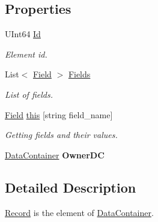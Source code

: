 \subsection*{Properties}
\begin{DoxyCompactItemize}
\item 
UInt64 \hyperlink{class_dwarf_d_b_1_1_data_structures_1_1_record_a6b33388f9fa7edcea1e29890da207be4}{Id}
\begin{DoxyCompactList}\small\item\em Element id. \item\end{DoxyCompactList}\item 
List$<$ \hyperlink{class_dwarf_d_b_1_1_data_structures_1_1_field}{Field} $>$ \hyperlink{class_dwarf_d_b_1_1_data_structures_1_1_record_ae901326df950b811aa2cbb5f632a21c3}{Fields}
\begin{DoxyCompactList}\small\item\em List of fields. \item\end{DoxyCompactList}\item 
\hyperlink{class_dwarf_d_b_1_1_data_structures_1_1_field}{Field} \hyperlink{class_dwarf_d_b_1_1_data_structures_1_1_record_a303a0895fdeb635fa47469b2ac46c4a3}{this} \mbox{[}string field\_\-name\mbox{]}
\begin{DoxyCompactList}\small\item\em Getting fields and their values. \item\end{DoxyCompactList}\item 
\hypertarget{class_dwarf_d_b_1_1_data_structures_1_1_record_adc6c66e17187956974f6102e89054528}{
\hyperlink{class_dwarf_d_b_1_1_data_structures_1_1_data_container}{DataContainer} {\bfseries OwnerDC}}
\label{class_dwarf_d_b_1_1_data_structures_1_1_record_adc6c66e17187956974f6102e89054528}

\end{DoxyCompactItemize}


\subsection{Detailed Description}
\hyperlink{class_dwarf_d_b_1_1_data_structures_1_1_record}{Record} is the element of \hyperlink{class_dwarf_d_b_1_1_data_structures_1_1_data_container}{DataContainer}. 

